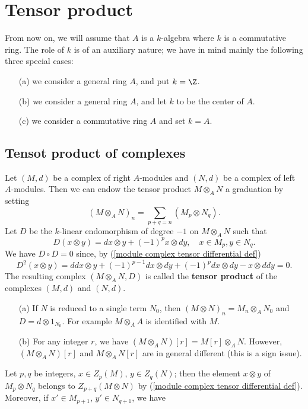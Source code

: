 \section{Tensor product}
From now on, we will assume that $A$ is a $k$-algebra where $k$ is a commutative ring. The role of $k$ is of an auxiliary nature; we have in mind mainly the following three special cases:
\begin{itemize}
\item[(a)] we consider a general ring $A$, and put $k=\Z$.
\item[(b)] we consider a general ring $A$, and let $k$ to be the center of $A$.
\item[(c)] we consider a commutative ring $A$ and set $k=A$.
\end{itemize}
\subsection{Tensot product of complexes}
Let $(M,d)$ be a complex of right $A$-modules and $(N,d)$ be a complex of left $A$-modules. Then we can endow the tensor product $M\otimes_AN$ a graduation by setting
\[(M\otimes_AN)_n=\sum_{p+q=n}(M_p\otimes N_q).\]
Let $D$ be the $k$-linear endomorphism of degree $-1$ on $M\otimes_AN$ such that
\begin{equation}\label{module complex tensor differential def}
D(x\otimes y)=dx\otimes y+(-1)^px\otimes dy,\quad x\in M_p,y\in N_q.
\end{equation}
We have $D\circ D=0$ since, by (\ref{module complex tensor differential def})
\[D^2(x\otimes y)=ddx\otimes y+(-1)^{p-1}dx\otimes dy+(-1)^pdx\otimes dy-x\otimes ddy=0.\]
The resulting complex $(M\otimes_AN,D)$ is called the \textbf{tensor product} of the complexes $(M,d)$ and $(N,d)$.
\begin{example}
\mbox{}
\begin{itemize}
\item[(a)] If $N$ is reduced to a single term $N_0$, then $(M\otimes N)_n=M_n\otimes_AN_0$ and $D=d\otimes 1_{N_0}$. For example $M\otimes_AA$ is identified with $M$.
\item[(b)] For any integer $r$, we have $(M\otimes_AN)[r]=M[r]\otimes_AN$. However, $(M\otimes_AN)[r]$ and $M\otimes_AN[r]$ are in general different (this is a sign issue).
\end{itemize}
\end{example}
Let $p,q$ be integers, $x\in Z_p(M)$, $y\in Z_q(N)$; then the element $x\otimes y$ of $M_p\otimes N_q$ belongs to $Z_{p+q}(M\otimes N)$ by (\ref{module complex tensor differential def}). Moreover, if $x'\in M_{p+1}$, $y'\in N_{q+1}$, we have

